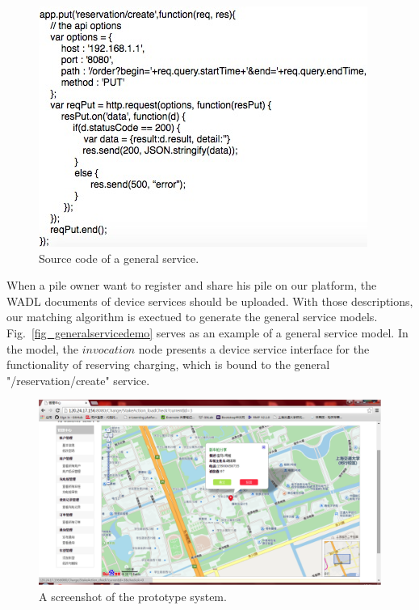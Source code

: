 \begin{figure}[!t]
\centering
\includegraphics[width=1.0\linewidth]{./graph/sourcecode}
\caption{Source code of a general service.}
\label{fig_sourcecode}
\end{figure}

When a pile owner want to register and share his pile on our platform, the WADL documents of device services should be uploaded. With those descriptions, our matching algorithm is exectued to generate the general service models. Fig.~\ref{fig_generalservicedemo} serves as an example of a general service model.
In the model, the $invocation$ node presents a device service interface for the functionality of reserving charging, which is bound to the general "/reservation/create" service. 

\begin{figure}[!b]
\centering
\includegraphics[width=1.0\linewidth]{./graph/prototype1}
\caption{A screenshot of the prototype system.}
\label{fig_prototype1}
\end{figure}


